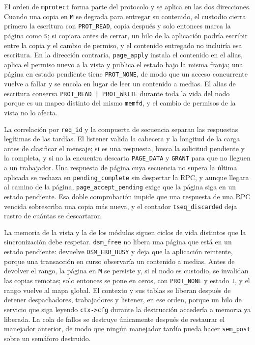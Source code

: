 El orden de \texttt{mprotect} forma parte del protocolo y se aplica en las dos direcciones. Cuando una copia en \texttt{M} se degrada para entregar su contenido, el custodio cierra primero la escritura con \texttt{PROT\_READ}, copia después y solo entonces marca la página como \texttt{S}; si copiara antes de cerrar, un hilo de la aplicación podría escribir entre la copia y el cambio de permiso, y el contenido entregado no incluiría esa escritura. En la dirección contraria, \texttt{page\_apply} instala el contenido en el alias, aplica el permiso nuevo a la vista y publica el estado bajo la misma franja; una página en estado pendiente tiene \texttt{PROT\_NONE}, de modo que un acceso concurrente vuelve a fallar y se encola en lugar de leer un contenido a medias. El alias de escritura conserva \texttt{PROT\_READ | PROT\_WRITE} durante toda la vida del nodo porque es un mapeo distinto del mismo \texttt{memfd}, y el cambio de permisos de la vista no lo afecta.

La correlación por \texttt{req\_id} y la compuerta de secuencia separan las respuestas legítimas de las tardías. El listener valida la cabecera y la longitud de la carga antes de clasificar el mensaje; si es una respuesta, busca la solicitud pendiente y la completa, y si no la encuentra descarta \texttt{PAGE\_DATA} y \texttt{GRANT} para que no lleguen a un trabajador. Una respuesta de página cuya secuencia no supera la última aplicada se rechaza en \texttt{pending\_complete} sin despertar la RPC, y aunque llegara al camino de la página, \texttt{page\_accept\_pending} exige que la página siga en un estado pendiente. Esa doble comprobación impide que una respuesta de una RPC vencida sobrescriba una copia más nueva, y el contador \texttt{tseq\_discarded} deja rastro de cuántas se descartaron.

La memoria de la vista y la de los módulos siguen ciclos de vida distintos que la sincronización debe respetar. \texttt{dsm\_free} no libera una página que está en un estado pendiente: devuelve \texttt{DSM\_ERR\_BUSY} y deja que la aplicación reintente, porque una transacción en curso observaría un contenido a medias. Antes de devolver el rango, la página en \texttt{M} se persiste y, si el nodo es custodio, se invalidan las copias remotas; solo entonces se pone en ceros, con \texttt{PROT\_NONE} y estado \texttt{I}, y el rango vuelve al mapa global. El contexto y sus tablas se liberan después de detener despachadores, trabajadores y listener, en ese orden, porque un hilo de servicio que siga leyendo \texttt{ctx->cfg} durante la destrucción accedería a memoria ya liberada. La cola de fallos se destruye únicamente después de restaurar el manejador anterior, de modo que ningún manejador tardío pueda hacer \texttt{sem\_post} sobre un semáforo destruido.
